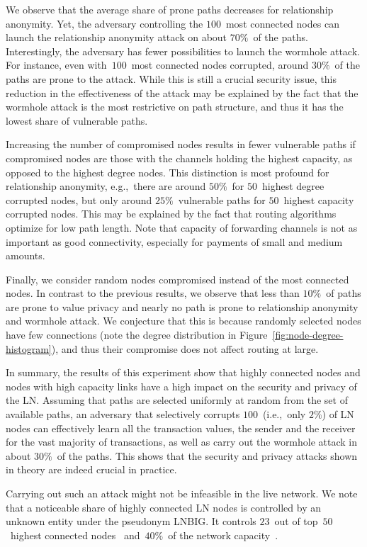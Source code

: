 We observe that the average share of prone paths decreases for relationship anonymity.
Yet, the adversary controlling the $100$~most connected nodes can launch the relationship anonymity attack on about $70\%$~of the paths.
Interestingly, the adversary has fewer possibilities to launch the wormhole attack.
For instance, even with~$100$~most connected nodes corrupted, around $30\%$~of the paths are prone to the attack.
While this is still a crucial security issue, this reduction in the effectiveness of the attack may be explained by the fact that the wormhole attack is the most restrictive on path structure, and thus it has the lowest share of vulnerable paths.

Increasing the number of compromised nodes results in fewer vulnerable paths if compromised nodes are those with the channels holding the highest capacity, as opposed to the highest degree nodes.
This distinction is most profound for relationship anonymity, e.g.,~there are around $50\%$~for $50$~highest degree corrupted nodes, but only around $25\%$~vulnerable paths for $50$~highest capacity corrupted nodes.
This may be explained by the fact that routing algorithms optimize for low path length.
Note that capacity of forwarding channels is not as important as good connectivity, especially for payments of small and medium amounts.

Finally, we consider random nodes compromised instead of the most connected nodes.
In contrast to the previous results, we observe that less than $10\%$~of paths are prone to value privacy and nearly no path is prone 
to relationship anonymity and wormhole attack.
We conjecture that this is because randomly selected nodes have few connections (note the degree distribution in Figure~\ref{fig:node-degree-histogram}), and thus their compromise does not affect routing at large.

In summary, the results of this experiment show that highly connected nodes and nodes with high capacity links have a high impact on the security and privacy of the LN\@.
Assuming that paths are selected uniformly at random from the set of available paths, an adversary that selectively corrupts $100$~(i.e.,~only $2\%$) of LN nodes can effectively learn all the transaction values, the sender and the receiver for the vast majority of transactions, as well as carry out the wormhole attack in about $30\%$~of the paths.
This shows that the security and privacy attacks shown in theory are indeed crucial in practice.

Carrying out such an attack might not be infeasible in the live network.
We note that a noticeable share of highly connected LN nodes is controlled by an unknown entity under the pseudonym LNBIG.
It controls $23$~out of top~$50$~highest connected nodes~\cite{1MLTopConnected} and~$40\%$~of the network capacity~\cite{TheBlockLNBIG}.


